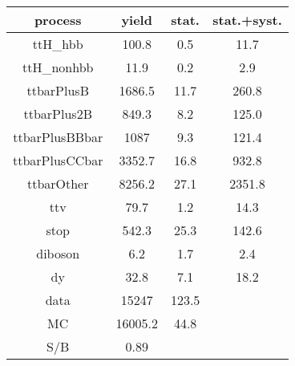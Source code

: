 \begin{tabular}{cccc}
\hline
    process     &  yield  &  stat.  &  stat.+syst.  \\
\hline
    ttH\_hbb     &  100.8  &   0.5   &     11.7      \\
   ttH\_nonhbb   &  11.9   &   0.2   &      2.9      \\
   ttbarPlusB   & 1686.5  &  11.7   &     260.8     \\
  ttbarPlus2B   &  849.3  &   8.2   &     125.0     \\
 ttbarPlusBBbar &  1087   &   9.3   &     121.4     \\
 ttbarPlusCCbar & 3352.7  &  16.8   &     932.8     \\
   ttbarOther   & 8256.2  &  27.1   &    2351.8     \\
      ttv       &  79.7   &   1.2   &     14.3      \\
      stop      &  542.3  &  25.3   &     142.6     \\
    diboson     &   6.2   &   1.7   &      2.4      \\
       dy       &  32.8   &   7.1   &     18.2      \\
\hline
      data      &  15247  &  123.5  &               \\
       MC       & 16005.2 &  44.8   &               \\
\hline
      S/B       &  0.89   &         &               \\
\hline
\end{tabular}
